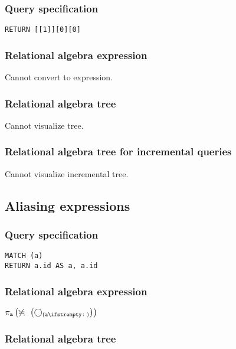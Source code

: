 \subsubsection*{Query specification}

\begin{lstlisting}
RETURN [[1]][0][0]
\end{lstlisting}

\subsubsection*{Relational algebra expression}

Cannot convert to expression.

\subsubsection*{Relational algebra tree}

Cannot visualize tree.

\subsubsection*{Relational algebra tree for incremental queries}

Cannot visualize incremental tree.

\subsection{Aliasing expressions}

\subsubsection*{Query specification}

\begin{lstlisting}
MATCH (a)
RETURN a.id AS a, a.id
\end{lstlisting}

\subsubsection*{Relational algebra expression}

$\projection{\var{a}} \left(\alldifferent{} \left(\getvertices{a}{}\right)\right)$

\subsubsection*{Relational algebra tree}

